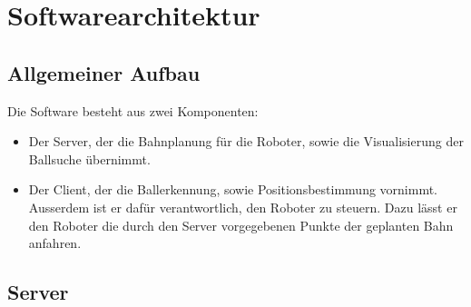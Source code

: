 
\chapter{Softwarearchitektur}
\label{cha:softwarearchitektur}

\section{Allgemeiner Aufbau}
\label{sec:allgemeiner-aufbau}

Die Software besteht aus zwei Komponenten:
\begin{itemize}
\item Der Server, der die Bahnplanung für die Roboter, sowie die
  Visualisierung der Ballsuche übernimmt.
\item Der Client, der die Ballerkennung, sowie Positionsbestimmung
  vornimmt. Ausserdem ist er dafür verantwortlich, den Roboter zu
  steuern. Dazu lässt er den Roboter die durch den Server vorgegebenen
  Punkte der geplanten Bahn anfahren. 
\end{itemize}
\section{Server}
\label{sec:server}


